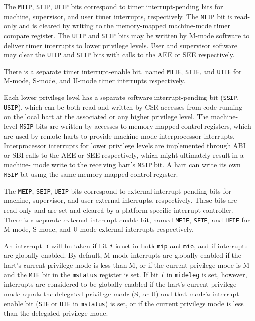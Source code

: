 The \texttt{MTIP}, \texttt{STIP}, \texttt{UTIP} bits correspond to timer interrupt-pending bits for
machine, supervisor, and user timer interrupts, respectively. The \texttt{MTIP}
bit is read-only and is cleared by writing to the memory-mapped
machine-mode timer compare register. The \texttt{UTIP} and \texttt{STIP} bits may be
written by M-mode software to deliver timer interrupts to lower
privilege levels. User and supervisor software may clear the \texttt{UTIP} and
\texttt{STIP} bits with calls to the AEE or SEE respectively.

There is a separate timer interrupt-enable bit, named \texttt{MTIE}, \texttt{STIE}, and
\texttt{UTIE} for M-mode, S-mode, and U-mode timer interrupts respectively.

Each lower privilege level has a separate software interrupt-pending bit
(\texttt{SSIP}, \texttt{USIP}), which can be both read and written by CSR accesses from
code running on the local hart at the associated or any higher privilege
level. The machine-level \texttt{MSIP} bits are written by accesses to
memory-mapped control registers, which are used by remote harts to
provide machine-mode interprocessor interrupts. Interprocessor
interrupts for lower privilege levels are implemented through ABI or SBI
calls to the AEE or SEE respectively, which might ultimately result in a
machine- mode write to the receiving hart's \texttt{MSIP} bit. A hart can write
its own \texttt{MSIP} bit using the same memory-mapped control register.

The \texttt{MEIP}, \texttt{SEIP}, \texttt{UEIP} bits correspond to external interrupt-pending bits for machine, supervisor, and user external interrupts, 
respectively. These bits are read-only and are set and cleared by a platform-specific
interrupt controller. There is a separate external interrupt-enable bit,
named \texttt{MEIE}, \texttt{SEIE}, and \texttt{UEIE} for M-mode, S-mode, 
and U-mode external interrupts respectively.

An interrupt\texttt{ \emph{i}} will be taken if bit \texttt{\emph{i}} is set in 
both \texttt{mip} and \texttt{mie}, and if interrupts are globally enabled. By default,
M-mode interrupts are globally enabled if the hart's current privilege mode is
less than M, or if the current privilege mode is M and the \texttt{MIE} bit in
the \texttt{mstatus} register is set. If bit \texttt{\emph{i}} in \texttt{mideleg} is 
set, however, interrupts are considered to be globally enabled if the hart's current
privilege mode equals the delegated privilege mode (S, or U) and that
mode's interrupt enable bit (\texttt{SIE} or \texttt{UIE} in \texttt{mstatus}) is 
set, or if the current privilege mode is less than the delegated privilege mode.

